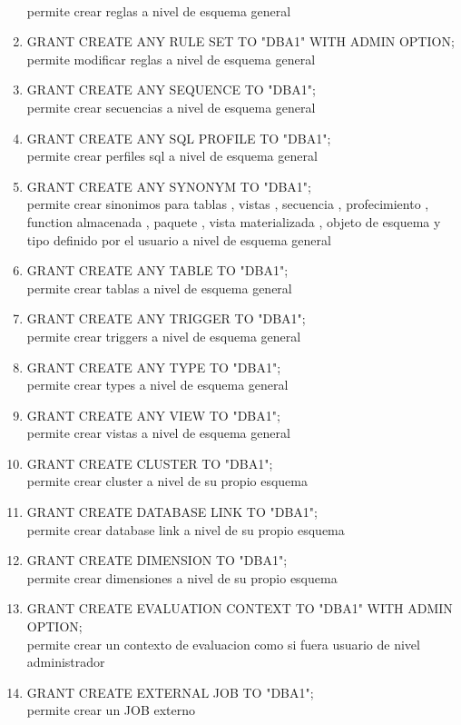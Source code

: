 \begin{enumerate}
\\  permite crear reglas a nivel de esquema general
\item GRANT CREATE ANY RULE SET TO "DBA1" WITH ADMIN OPTION;
\\  permite modificar reglas a nivel de esquema general
\item GRANT CREATE ANY SEQUENCE TO "DBA1";
\\  permite crear secuencias a nivel de esquema general
\item GRANT CREATE ANY SQL PROFILE TO "DBA1";
\\  permite crear perfiles sql a nivel de esquema general
\item GRANT CREATE ANY SYNONYM TO "DBA1"; 
\\ permite crear sinonimos para tablas , vistas , secuencia , profecimiento , function almacenada , paquete , vista materializada ,  objeto de esquema y tipo definido  por el usuario a nivel de esquema general
\item GRANT CREATE ANY TABLE TO "DBA1";
\\  permite crear tablas a nivel de esquema general
\item GRANT CREATE ANY TRIGGER TO "DBA1";
\\  permite crear triggers a nivel de esquema general
\item GRANT CREATE ANY TYPE TO "DBA1";
\\  permite crear types a nivel de esquema general
\item GRANT CREATE ANY VIEW TO "DBA1";
\\  permite crear vistas a nivel de esquema general
\item GRANT CREATE CLUSTER TO "DBA1";
\\  permite crear cluster a nivel de su propio esquema
\item GRANT CREATE DATABASE LINK TO "DBA1";
\\  permite crear database link a nivel de su propio esquema
\item GRANT CREATE DIMENSION TO "DBA1";
\\  permite crear dimensiones a nivel de su propio esquema
\item GRANT CREATE EVALUATION CONTEXT TO "DBA1" WITH ADMIN OPTION;
\\ permite crear un contexto de evaluacion como si fuera usuario de nivel administrador
\item GRANT CREATE EXTERNAL JOB TO "DBA1";
\\ permite crear un JOB externo

\end{enumerate}
